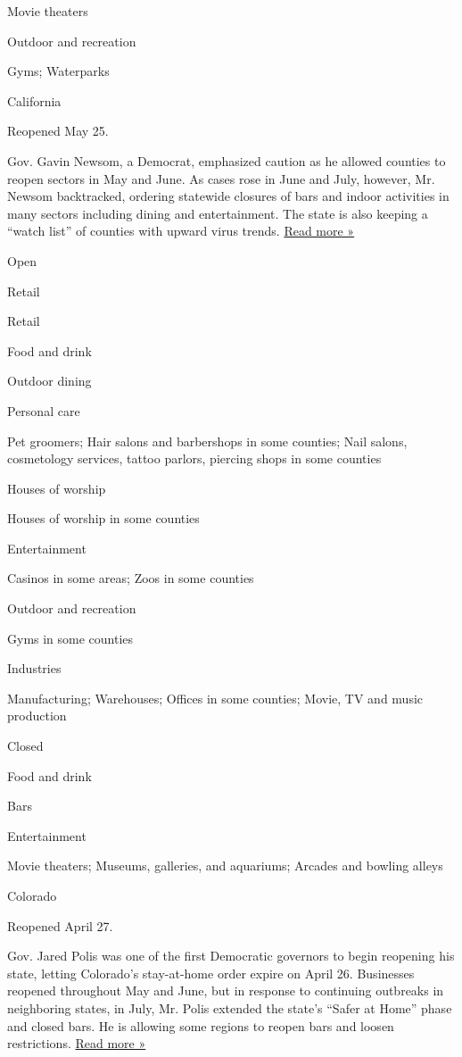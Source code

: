Movie theaters

Outdoor and recreation

Gyms; Waterparks

California

Reopened May 25.

Gov. Gavin Newsom, a Democrat, emphasized caution as he allowed counties
to reopen sectors in May and June. As cases rose in June and July,
however, Mr. Newsom backtracked, ordering statewide closures of bars and
indoor activities in many sectors including dining and entertainment.
The state is also keeping a ``watch list'' of counties with upward virus
trends.
\href{https://www.latimes.com/projects/california-coronavirus-cases-tracking-outbreak/reopening-across-counties/}{Read
more »}

Open

Retail

Retail

Food and drink

Outdoor dining

Personal care

Pet groomers; Hair salons and barbershops in some counties; Nail salons,
cosmetology services, tattoo parlors, piercing shops in some counties

Houses of worship

Houses of worship in some counties

Entertainment

Casinos in some areas; Zoos in some counties

Outdoor and recreation

Gyms in some counties

Industries

Manufacturing; Warehouses; Offices in some counties; Movie, TV and music
production

Closed

Food and drink

Bars

Entertainment

Movie theaters; Museums, galleries, and aquariums; Arcades and bowling
alleys

Colorado

Reopened April 27.

Gov. Jared Polis was one of the first Democratic governors to begin
reopening his state, letting Colorado's stay-at-home order expire on
April 26. Businesses reopened throughout May and June, but in response
to continuing outbreaks in neighboring states, in July, Mr. Polis
extended the state's ``Safer at Home'' phase and closed bars. He is
allowing some regions to reopen bars and loosen restrictions.
\href{https://denver.cbslocal.com/2020/06/30/polis-colorado-bars-coronavirus/}{Read
more »}

